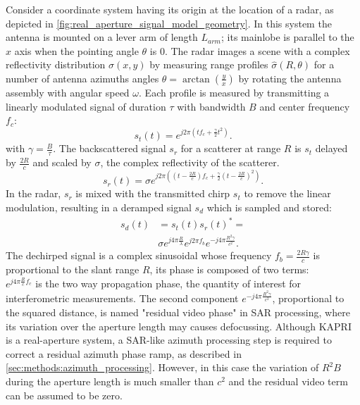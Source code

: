 Consider a coordinate system having its origin at the location of a radar, as depicted in \autoref{fig:real_aperture_signal_model_geometry}. In this system the antenna is mounted on a lever arm of length $L_{arm}$; its mainlobe is parallel to the $x$ axis when the pointing angle $\theta$ is 0. The radar images a scene with a complex reflectivity distribution $\sigma\left(x,y\right)$ by measuring range profiles $\hat{\sigma}\left(R, \theta\right)$ for a number of antenna azimuths angles $\theta = \operatorname{arctan}\left(\frac{y}{x}\right)$ by rotating the antenna assembly with angular speed $\omega$. Each profile is measured by transmitting a linearly modulated signal of duration $\tau$ with bandwidth $B$ and center frequency $f_c$:
\begin{equation}
	s_t\left(t\right) = e^{j 2 \pi \left( t f_{c} + \frac{\gamma}{2} t^2 \right)}.
\end{equation}
with $\gamma = \frac{B}{\tau}$.
The backscattered signal $s_r$ for a scatterer at range $R$ is $s_t$ delayed by $\frac{2 R}{c}$ and scaled by  $\sigma$, the complex reflectivity of the scatterer.
\begin{equation}
		s_r\left(t\right) = \sigma e^{j 2 \pi \left( \left(t - \frac{2 R}{c}\right) f_{c} +  \frac{\gamma}{2} \left(t - \frac{2 R}{c}\right)^2 \right)}.
\end{equation}
In the radar, $s_r$ is mixed with the transmitted chirp $s_t$  to remove the linear modulation, resulting in a deramped signal $s_d$ which is sampled and stored: 
\begin{equation}\label{eq:deramp}
	\begin{aligned}
	s_{d}\left(t\right) &=s_t\left(t\right)s_r\left(t\right)^* =\\ 
	&\sigma e^{j 4 \pi \frac{ R}{\lambda}}  e^{j 2 \pi f_b}  e^{-j 4 \pi \frac{R^2 \gamma}{c^2}}.
	\end{aligned}
\end{equation} 
The dechirped signal is a complex sinusoidal whose frequency $f_{b} = \frac{2 R \gamma}{c}$ is proportional to the slant range $R$, its phase is composed of two terms:\\ $ e^{j 4 \pi \frac{R}{c}f_c}$ is the two way propagation phase, the quantity of interest for  interferometric measurements. The second component $e^{-j 4 \pi \frac{R^2 \gamma}{c^2}}$, proportional to the squared distance, is named "residual video phase" in SAR processing, where its variation over the aperture length may causes defocussing. Although KAPRI is a real-aperture system, a SAR-like azimuth processing step is required to correct a residual azimuth phase ramp, as described in \autoref{sec:methods:azimuth_processing}. However, in this case the variation of $R^2B$ during the aperture length is much smaller than $c^2$ and the residual video term can be assumed to be zero.\\
